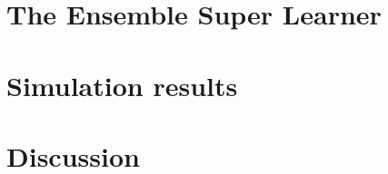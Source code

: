 \documentclass[11pt, a4paper]{article}
\newtheorem{theorem}{Theorem}
\theoremstyle{definition}
\theoremstyle{remark}
\newcommand{\q}{q}
\newcommand{\btheta}{\theta}
\begin{document}
%
%



\section{The Ensemble Super Learner}
\section{Simulation results}
\section{Discussion}
\printbibliography
\end{document}
